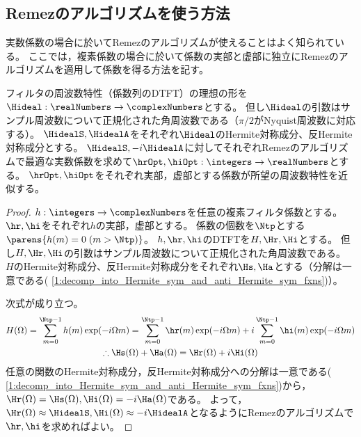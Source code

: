     \subsection{Remezのアルゴリズムを使う方法}
        実数係数の場合に於いてRemezのアルゴリズムが使えることはよく知られている。
        ここでは，複素係数の場合に於いて係数の実部と虚部に独立にRemezのアルゴリズムを適用して係数を得る方法を記す。
        \begin{shadebox}
            フィルタの周波数特性（係数列のDTFT）の理想の形を$\Hideal:\realNumbers\to\complexNumbers$とする。
            但し$\Hideal$の引数はサンプル周波数について正規化された角周波数である（$\pi/2$がNyquist周波数に対応する）。
            $\HidealS,\HidealA$をそれぞれ$\Hideal$のHermite対称成分、反Hermite対称成分とする。
            $\HidealS,-i\HidealA$に対してそれぞれRemezのアルゴリズムで最適な実数係数を求めて$\hrOpt,\hiOpt:\integers\to\realNumbers$とする。
            $\hrOpt,\hiOpt$をそれぞれ実部，虚部とする係数が所望の周波数特性を近似する。
        \end{shadebox}
        \begin{proof}
            $h:\integers\to\complexNumbers$を任意の複素フィルタ係数とする。
            $\hr,\hi$をそれぞれ$h$の実部，虚部とする。
            係数の個数を$\Ntp$とする$\parens{h(m)=0\;(m>\Ntp)}$。
            $h,\hr,\hi$のDTFTを$H,\Hr,\Hi$とする。
            但し$H,\Hr,\Hi$の引数はサンプル周波数について正規化された角周波数である。
            $H$のHermite対称成分、反Hermite対称成分をそれぞれ$\Hs,\Ha$とする（分解は一意である(\cite{数学備忘録} \ref{1:decomp_into_Hermite_sym_and_anti_Hermite_sym_fxns})）。
            \par
            次式が成り立つ。
            \begin{gather*}
                H(\Omega) = \sum_{m=0}^{\Ntp-1}h(m)\exp(-i\Omega m) = \sum_{m=0}^{\Ntp-1}\hr(m)\exp(-i\Omega m) + i\sum_{m=0}^{\Ntp-1}\hi(m)\exp(-i\Omega m) \\
                \therefore\Hs(\Omega) + \Ha(\Omega) = \Hr(\Omega) + i\Hi(\Omega)
            \end{gather*}
            任意の関数のHermite対称成分，反Hermite対称成分への分解は一意である(\cite{数学備忘録} \ref{1:decomp_into_Hermite_sym_and_anti_Hermite_sym_fxns})から，$\Hr(\Omega) = \Hs(\Omega),\Hi(\Omega) = -i\Ha(\Omega)$である。
            よって，$\Hr(\Omega)\approx\HidealS,\Hi(\Omega)\approx -i\HidealA$となるようにRemezのアルゴリズムで$\hr,\hi$を求めればよい。
        \end{proof}
